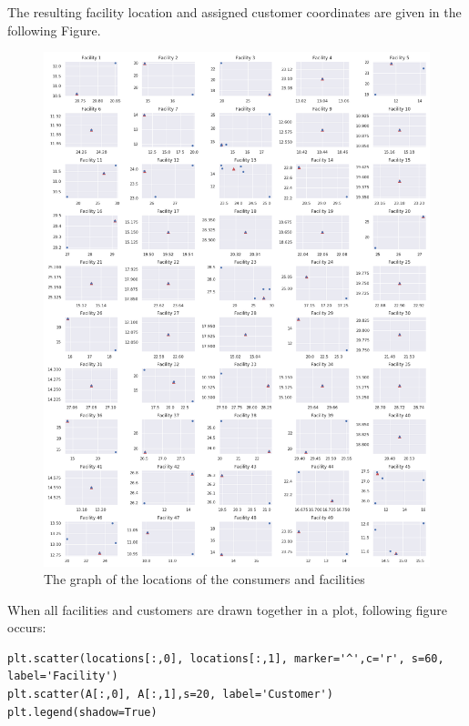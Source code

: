\documentclass[12pt]{article}
\begin{document}
The resulting facility location and assigned customer coordinates are given in the following Figure.
\begin{figure}[ht] 
    \centering
    \includegraphics[width=\textwidth]{ala_euclidean_1.png}
    \caption{The graph of the locations of the consumers and facilities}
\end{figure}
\FloatBarrier
When all facilities and customers are drawn together in a plot, following figure occurs:
\begin{lstlisting}[style=pythonstyle]
plt.scatter(locations[:,0], locations[:,1], marker='^',c='r', s=60, label='Facility')
plt.scatter(A[:,0], A[:,1],s=20, label='Customer')
plt.legend(shadow=True)
\end{lstlisting}
\end{document}
